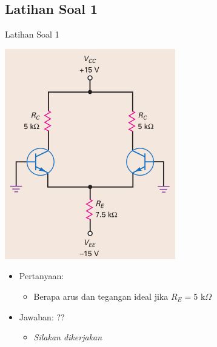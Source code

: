 \documentclass[aspectratio=169]{beamer}
\begin{document}
\subsection{Latihan Soal 1}
\begin{frame}{Latihan Soal 1}
	\begin{multicols}{2}
		\begin{center}
			\includegraphics[width=0.6\textheight]{gambar/01.diff-amp/01.latihan_soal_1a}
		\end{center}
		\columnbreak
		\begin{itemize}
			\item Pertanyaan:
			\begin{itemize}
				\item Berapa arus dan tegangan ideal jika $ R_E = 5 \text{ k}\Omega $
			\end{itemize}
			\item Jawaban: ??
			\begin{itemize}
				\item \textit{Silakan dikerjakan}
			\end{itemize}
		\end{itemize}
		\vfill\null
	\end{multicols}
\end{frame}
\end{document}
